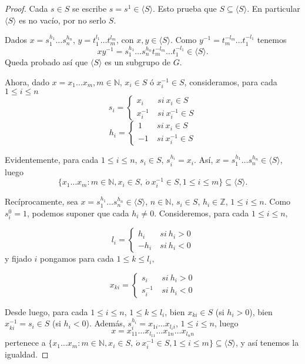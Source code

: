 \documentclass[12pt]{article}
\begin{document}
\begin{proof}
Cada $s \in S$ se escribe $s = s^1 \in \langle S \rangle$. Esto prueba que $S \subseteq \langle S \rangle$. En particular $\langle S \rangle$ es no vacío, por no serlo $S$.

Dados $x = s_1^{h_1} \ldots s_n^{h_n}$, $y = t_1^{l_1}\ldots t_m^{l_m}$, con $x,y \in \langle S \rangle$. Como $y^{-1}= t_m ^{-l_m} \ldots t_1^{-l_1}$ tenemos $$xy^{-1} = s_1^{h_1} \ldots s_n^{h_n}t_m ^{-l_m} \ldots t_1^{-l_1} \in \langle S \rangle.$$ Queda probado así que $\langle S \rangle$ es un subgrupo de $G$.

Ahora, dado $x = x_1 \ldots x_m, m \in \mathbb{N}$, $x_i \in S$ ó $x_i^{-1} \in S$, consideramos, para cada $1 \leq i \leq n$ 
$$
s_i = \left\{
    \begin{array}{ll}
        x_i&~si~ x_i \in S \\
       x_i^{-1}&~si~ x_i^{-1} \in S
    \end{array}
\right.
$$
$$
h_i = \left\{
    \begin{array}{ll}
       1&~si~ x_i \in S \\
       -1&~si~ x_i^{-1} \in S
    \end{array}
\right.
$$

Evidentemente, para cada $1 \leq i \leq n$, $s_i \in S$, $s_i^{h_i} = x_i$. Así, $x = s_1^{h_1} \ldots s_n^{h_n} \in \langle S \rangle$, luego $$\lbrace x_1 \ldots x_m: m \in \mathbb{N}, x_i \in S,~\acute{o}~ x_i^{-1} \in S, 1 \leq i \leq m \rbrace \subseteq \langle S \rangle.$$

Recíprocamente, sea $x =  s_1^{h_1} \ldots s_n^{h_n} \in \langle S \rangle$, $n \in \mathbb{N}$, $s_i \in S$, $h_i \in \mathbb{Z}$, $1 \leq i \leq n$. Como $s_i^0 = 1$, podemos suponer que cada $h_i \neq 0$. Consideremos, para cada $1 \leq i \leq n, $ 

$$
l_i = \left\{
    \begin{array}{ll}
        h_i&~si~ h_i >0 \\
       	-h_i&~si~ h_i <0
    \end{array}
\right.
$$
 y fijado $i$ pongamos para cada $1 \leq k \leq l_i,$ 
 
$$
x_{ki} = \left\{
    \begin{array}{ll}
        s_i&~si~ h_i >0 \\
       	s_i^{-1}&~si~ h_i <0
    \end{array}
\right.
$$ 

Desde luego, para cada $1 \leq i \leq n$, $1 \leq k \leq l_i$, bien $x_{ki}  \in S$ (si $h_i >0$), bien $x^{-1}_{ki} = s_i \in S$ (si $h_i <0$). Además, $s_i ^{h_i} = x_{1i} \ldots x_{l_ii}$, $1 \leq i \leq n$, luego $$x = x_{11} \ldots x_{l_11} \ldots x_{1n} \ldots x_{l_nn}$$ pertenece a $\lbrace x_1 \ldots x_m: m \in \mathbb{N}, x_i \in S,~\acute{o}~ x_i^{-1} \in S, 1 \leq i \leq m \rbrace \subseteq \langle S \rangle$, y así tenemos la igualdad.


\end{proof}
\end{document}
